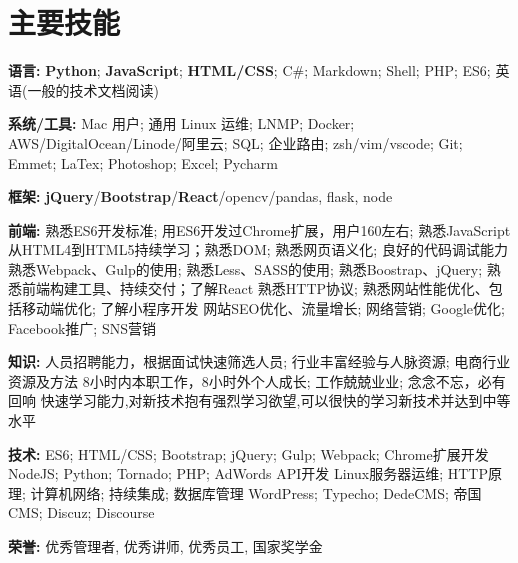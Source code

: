 \section{\textbf{主要技能}}
\resumeSubHeadingListStart
\item{
  \textbf{语言:}{ \textbf{Python}; \textbf{JavaScript}; \textbf{HTML/CSS}; C\#; Markdown; Shell; PHP; ES6; 英语(一般的技术文档阅读)}
}
\item{
 \textbf{系统/工具:}{ Mac 用户; 通用 Linux 运维; LNMP; Docker; AWS/DigitalOcean/Linode/阿里云; SQL; 企业路由; zsh/vim/vscode; Git; Emmet; LaTex; Photoshop; Excel; Pycharm}
}
\item{
 \textbf{框架:}{ \textbf{jQuery}/\textbf{Bootstrap}/\textbf{React}/opencv/pandas, flask, node}
}
\item{
  \textbf{前端:}{
    \resumeItemListStart
       {熟悉ES6开发标准; 用ES6开发过Chrome扩展，用户160左右; 熟悉JavaScript}
       {从HTML4到HTML5持续学习；熟悉DOM; 熟悉网页语义化; 良好的代码调试能力}
       {熟悉Webpack、Gulp的使用; 熟悉Less、SASS的使用; 熟悉Boostrap、jQuery; 熟悉前端构建工具、持续交付；了解React}
       {熟悉HTTP协议; 熟悉网站性能优化、包括移动端优化; 了解小程序开发}
       {网站SEO优化、流量增长; 网络营销; Google优化; Facebook推广; SNS营销}
   \resumeItemListEnd
  }
}
\item{
  \textbf{知识:}{
    \resumeItemListStart
       {人员招聘能力，根据面试快速筛选人员; 行业丰富经验与人脉资源; 电商行业资源及方法}
       {8小时内本职工作，8小时外个人成长; 工作兢兢业业; 念念不忘，必有回响}
       {快速学习能力,对新技术抱有强烈学习欲望,可以很快的学习新技术并达到中等水平}
   \resumeItemListEnd
  }
}
\item{
  \textbf{技术:}{
    \resumeItemListStart
       {ES6; HTML/CSS; Bootstrap; jQuery; Gulp; Webpack; Chrome扩展开发}
       {NodeJS; Python; Tornado; PHP; AdWords API开发}
       {Linux服务器运维; HTTP原理; 计算机网络; 持续集成; 数据库管理}
       {WordPress; Typecho; DedeCMS; 帝国 CMS; Discuz; Discourse}
   \resumeItemListEnd
  }
}
\item{
 \textbf{荣誉:}{
  优秀管理者, 优秀讲师, 优秀员工, 国家奖学金
 }
}
\resumeSubHeadingListEnd
